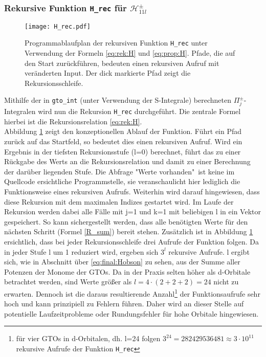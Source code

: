 \subsubsection{Rekursive Funktion \texttt{H\_rec} für $\mathcal{H}_{11l}^\pm$}
%
%
\begin{figure}[H] \centering
	\texttt{[image: H\_rec.pdf]}
	\caption{Programmablaufplan der rekursiven Funktion \texttt{H\_rec}  unter 
		Verwendung der Formeln \ref{eq:rek:H}  und \ref{eq:prop:H}. Pfade, die 
		auf 
		den Start zurückführen, bedeuten einen rekursiven Aufruf mit 
		veränderten 
		Input. Der dick markierte Pfad zeigt die Rekursionsschleife.}
	\label{pic:FC:H_rec} 
\end{figure}
%
Mithilfe der in \texttt{gto\_int} (unter Verwendung der S-Integrale) 
berechneten 
$\Pi^\pm_j$-Integralen wird nun die Rekursion \texttt{H\_rec} durchgeführt.
Die zentrale Formel hierbei ist die Rekursionsrelation \ref{eq:rek:H}.\\
%
 Abbildung 
\ref{pic:FC:H_rec} zeigt den konzeptionellen Ablauf der Funktion. Führt ein 
Pfad zurück auf das Startfeld, so bedeutet dies einen rekursiven 
Aufruf. Wird ein Ergebnis in der tiefsten Rekursionsstufe (l=0) berechnet, 
führt das zu einer Rückgabe des Werts an die Rekursionsrelation und damit zu 
einer Berechnung der darüber liegenden Stufe. Die Abfrage "Werte vorhanden"\ 
ist keine im Quellcode ersichtliche Programmstelle, sie veranschaulicht hier
lediglich die Funktionsweise eines rekursiven Aufrufs. Weiterhin wird darauf 
hingewiesen, dass diese Rekursion mit dem maximalen Indizes gestartet wird. Im 
Laufe der Rekursion werden dabei alle Fälle mit j=1 und k=1 mit beliebigen l in 
ein 
Vektor gespeichert. So kann sichergestellt werden, dass alle 
benötigten Werte für den nächsten Schritt (Formel \ref{R_sum}) bereit stehen. 
Zusätzlich ist in Abbildung \ref{pic:FC:H_rec} ersichtlich, dass bei jeder 
Rekursionsschleife drei 
Aufrufe der Funktion folgen. Da in jeder Stufe l um 1 reduziert wird, 
ergeben 
sich $3^l$ rekursive Aufrufe. l ergibt sich, wie in  Abschnitt über 
\ref{eq:final:Hobson} zu sehen, aus 
der Summe aller Potenzen der Monome der GTOs. Da in der Praxis 
selten höher als d-Orbitale betrachtet werden, sind Werte größer als $l=4\cdot 
(2+2+2)=24$ nicht 
zu erwarten. Dennoch ist die daraus resultierende Anzahl\footnote{für vier GTOs 
in 
d-Orbitalen, dh. l=24 folgen $3^{24}=282429536481\approx3\cdot 10^{11}$ 
rekursive Aufrufe der Funktion \texttt{H\_rec}} der Funktionsaufrufe sehr 
hoch und kann prinzipiell zu Fehlern führen. Daher wird an dieser Stelle auf 
potentielle Laufzeitprobleme oder Rundungsfehler für hohe Orbitale hingewiesen.
%
%
%
